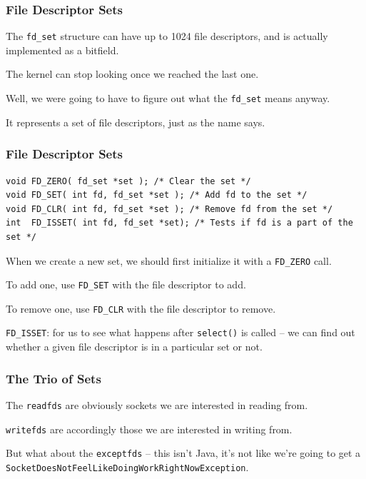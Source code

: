 \begin{frame}
	\frametitle{File Descriptor Sets}

	The \texttt{fd\_set} structure can have up to 1024 file descriptors, and is actually implemented as a bitfield.

	The kernel can stop looking once we reached the last one.

	Well, we were going to have to figure out what the \texttt{fd\_set} means anyway.

	It represents a set of file descriptors, just as the name says.

\end{frame}

\begin{frame}[fragile]
	\frametitle{File Descriptor Sets}

	\begin{lstlisting}
void FD_ZERO( fd_set *set ); /* Clear the set */
void FD_SET( int fd, fd_set *set ); /* Add fd to the set */
void FD_CLR( int fd, fd_set *set ); /* Remove fd from the set */
int  FD_ISSET( int fd, fd_set *set); /* Tests if fd is a part of the set */ 
\end{lstlisting}

	When we create a new set, we should first initialize it with a \texttt{FD\_ZERO} call.

	To add one, use \texttt{FD\_SET} with the file descriptor to add.

	To remove one, use \texttt{FD\_CLR} with the file descriptor to remove.

	\texttt{FD\_ISSET}: for us to see what happens after \texttt{select()} is called -- we can find out whether a given file descriptor is in a particular set or not.

\end{frame}

\begin{frame}
	\frametitle{The Trio of Sets}

	The \texttt{readfds} are obviously sockets we are interested in reading from.

	\texttt{writefds} are accordingly those we are interested in writing from.

	But what about the \texttt{exceptfds} -- this isn't Java, it's not like we're going to get a \texttt{SocketDoesNotFeelLikeDoingWorkRightNowException}.


\end{frame}

